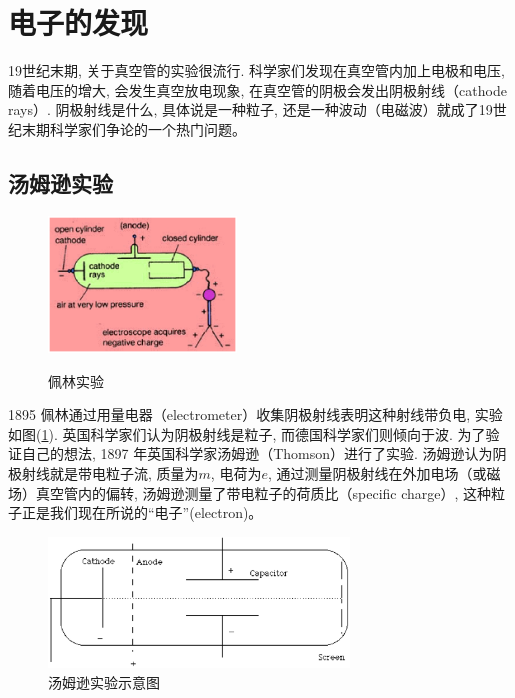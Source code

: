 \section{电子的发现}

19世纪末期, 关于真空管的实验很流行.
科学家们发现在真空管内加上电极和电压, 随着电压的增大,
会发生真空放电现象, 在真空管的阴极会发出阴极射线（cathode rays）.
阴极射线是什么, 具体说是一种粒子,
还是一种波动（电磁波）就成了19世纪末期科学家们争论的一个热门问题。

\subsection{汤姆逊实验}

\begin{figure}[h]
\begin{center}
  \includegraphics[width=5cm]{AtomIdea/perrin.ps}\\
  \caption{佩林实验}\label{Perrin experiment}
\end{center}
\end{figure}



1895 佩林通过用量电器（electrometer）收集阴极射线表明这种射线带负电,
实验如图(\ref{Perrin experiment}). 英国科学家们认为阴极射线是粒子,
而德国科学家们则倾向于波. 为了验证自己的想法, 1897
年英国科学家汤姆逊（Thomson）进行了实验.
汤姆逊认为阴极射线就是带电粒子流, 质量为$m$, 电荷为$e$,
通过测量阴极射线在外加电场（或磁场）真空管内的偏转,
汤姆逊测量了带电粒子的荷质比（specific charge）,
这种粒子正是我们现在所说的“电子”(electron)。

\begin{figure}[h]
\begin{center}
\includegraphics[clip,width=8cm]{AtomIdea/1-1.eps}
\caption{汤姆逊实验示意图}
\end{center}
\end{figure}

